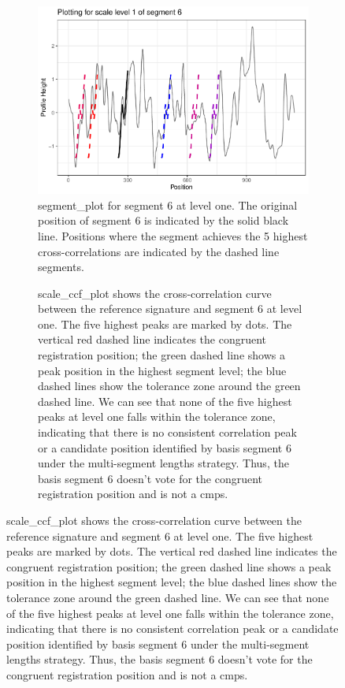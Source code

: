 \begin{figure}
\begin{subfigure}[t]{\textwidth}
\caption{\label{fig:segplot}segment\_plot for segment 6 at level one. The original position of segment 6 is indicated by the solid black line. Positions where the segment achieves the 5 highest cross-correlations are indicated by the dashed line segments.}
\vspace{1em}
\begin{adjustbox}{valign=t}
\begin{minipage}{.39\textwidth}

{\small {}
\begin{Schunk}
\end{Schunk}
}
\vspace{1em}
\end{minipage}
\begin{minipage}{.59\textwidth}
\includegraphics[width=\textwidth]{ju-hofmann_files/figure-latex/segplot-1.pdf}
\end{minipage}
\end{adjustbox}
\end{subfigure}
\begin{subfigure}[t]{\textwidth}
\caption{\label{fig:segplot2}scale\_ccf\_plot shows the cross-correlation curve between the reference signature and segment 6 at level one. The five highest peaks are marked by dots. The vertical red dashed line indicates the congruent registration position; the green dashed line shows a peak position in the highest segment level; the blue dashed lines show the tolerance zone around the green dashed line. We can see that none of the five highest peaks at level one falls within the tolerance zone, indicating that there is no consistent correlation peak or a candidate position identified by basis segment 6 under the multi-segment lengths strategy. Thus, the basis segment 6 doesn't vote for the congruent registration position and is not a cmps.}
\vspace{1em}
\begin{adjustbox}{valign=t}
\begin{minipage}{.39\textwidth}


\end{minipage}
\end{adjustbox}
\end{subfigure}
\end{figure}
